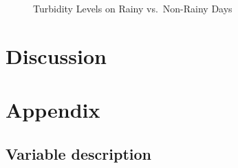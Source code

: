\documentclass[
  letterpaper,
  DIV=11,
  numbers=noendperiod]{scrartcl}
\begin{document}
\begin{figure}


\caption{\label{fig-box1}Turbidity Levels on Rainy vs.~Non-Rainy Days}

\end{figure}%

\newpage

\section{Discussion}\label{third}

\subsection{}\label{section}

\newpage

\section{Appendix}\label{appendix-a}

\subsection{Variable description}\label{appendix-a.1}

\begingroup\fontsize{10}{12}\selectfont
\end{document}
